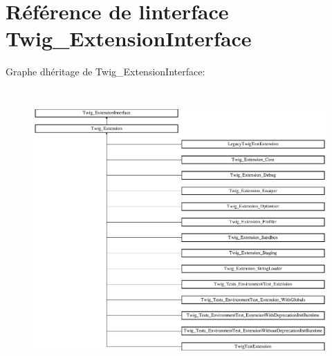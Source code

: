 \hypertarget{interface_twig___extension_interface}{}\section{Référence de l\textquotesingle{}interface Twig\+\_\+\+Extension\+Interface}
\label{interface_twig___extension_interface}
Graphe d\textquotesingle{}héritage de Twig\+\_\+\+Extension\+Interface\+:\begin{figure}[H]
\begin{center}
\leavevmode
\includegraphics[height=10.847458cm]{interface_twig___extension_interface}
\end{center}
\end{figure}
